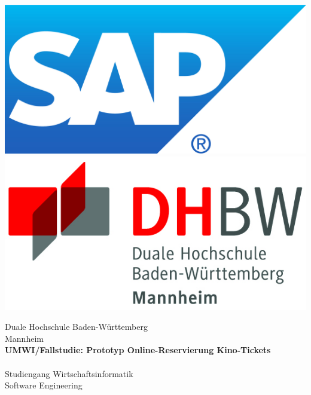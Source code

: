 \begin{titlepage}
\begin{minipage}{\textwidth}
		\vspace{-2cm}
		\noindent \includegraphics[scale=0.28]{img/firmenlogo.jpg} \hfill   \includegraphics{img/logo.jpg}
\end{minipage}
\vspace{1.5em}
\sffamily
\begin{center}
	\textsf{\large{}Duale Hochschule Baden-W\"urttemberg\\[1.5mm] Mannheim}\\[2em]
	\textsf{\textbf{UMWI/Fallstudie: Prototyp Online-Reservierung Kino-Tickets }}\\[5mm]
	\textsf{\textbf{\Large{}\DerTitelDerArbeit}} \\[1.5cm]
	\textsf{Studiengang Wirtschaftsinformatik\\ Software Engineering}
	
	\vspace{2em}
\vfill

\begin{minipage}{\textwidth}


\end{minipage}
\end{center}
\end{titlepage}
